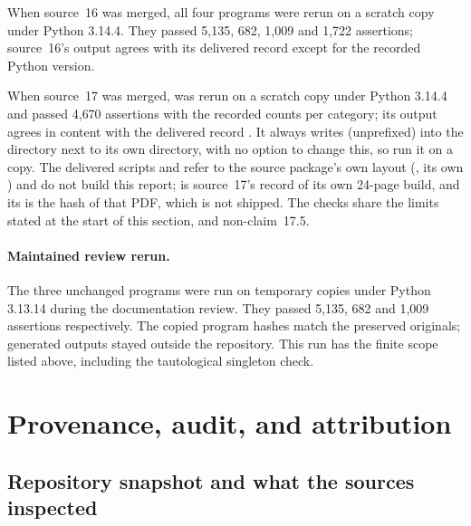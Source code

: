 \documentclass[11pt]{article}
\numberwithin{equation}{section}
\theoremstyle{definition}
\theoremstyle{remark}
\begin{document}
When source~16 was merged, all four programs were rerun on a scratch copy under
Python 3.14.4. They passed 5{,}135, 682, 1{,}009 and 1{,}722 assertions; source~16's
output agrees with its delivered record except for the recorded Python version.

When source~17 was merged,  was rerun on a
scratch copy under Python 3.14.4 and passed 4{,}670 assertions with the recorded
counts per category; its output agrees in content with the delivered record
. It always writes
 (unprefixed) into the  directory next to
its own  directory, with no option to change this, so run it on a copy.
The delivered scripts  and
 refer to the source package's own layout
(, its own ) and do not build this report;
 is source~17's record of its own
24-page build, and its  is the hash of that PDF, which is not
shipped. The checks share the limits stated at the start of this section, and
non-claim~17.5.

\paragraph{Maintained review rerun.}
The three unchanged programs were run on temporary copies under Python
3.13.14 during the documentation review. They passed 5,135, 682 and 1,009
assertions respectively. The copied program hashes match the preserved
originals; generated outputs stayed outside the repository. This run has
the finite scope listed above, including the tautological singleton check.

\section{Provenance, audit, and attribution}\label{meas:sec:audit}

\subsection{Repository snapshot and what the sources inspected}
\end{document}
